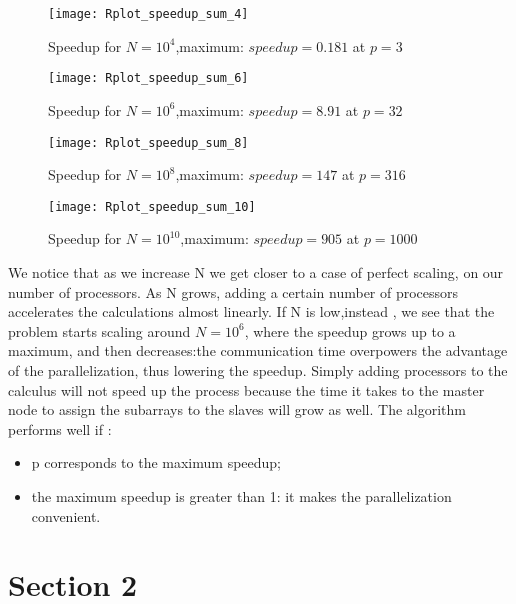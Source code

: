\documentclass[11pt]{scrartcl} %
\begin{document}
\begin{figure}[H] %
	\centering
	\texttt{[image: Rplot\_speedup\_sum\_4]} %
	\caption{Speedup for $N=10^4$,maximum: $speedup = 0.181$ at $p = 3$}
\end{figure}
\begin{figure}[H] %
	\centering
	\texttt{[image: Rplot\_speedup\_sum\_6]} %
	\caption{Speedup for $N=10^6$,maximum: $speedup = 8.91$ at $p = 32$}
\end{figure}
\begin{figure}[H] %
	\centering
	\texttt{[image: Rplot\_speedup\_sum\_8]} %
	\caption{Speedup for $N=10^8$,maximum: $speedup = 147$ at $p = 316$}
\end{figure}
\begin{figure}[H] %
	\centering
	\texttt{[image: Rplot\_speedup\_sum\_10]} %
	\caption{Speedup for $N=10^10$,maximum: $speedup = 905$ at $p = 1000$}
\end{figure}

We notice that as we increase N we get closer to a case of perfect scaling, on our number of processors. As N grows, adding a certain number of processors accelerates the calculations almost linearly.
If N is low,instead , we see that the problem starts scaling around $N=10^6$, where the speedup grows up to a maximum, and then decreases:the communication time overpowers the advantage of the parallelization, thus lowering the speedup.
 Simply adding processors to the calculus will not speed up the process because the time it takes to the master node to assign the subarrays to the slaves will grow as well.
The algorithm performs well if :
\begin{itemize}
	\item p corresponds to the maximum speedup;
	\item the maximum speedup is greater than 1: it makes the parallelization convenient.
\end{itemize}
\section{Section 2}
\end{document}
